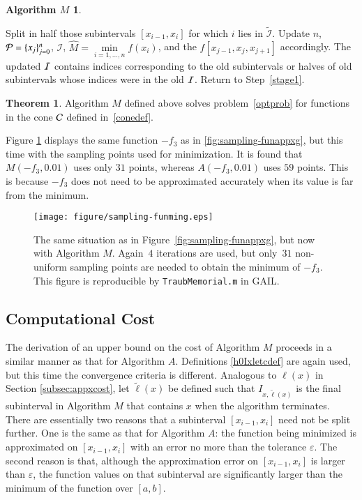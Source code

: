 \documentclass[review]{elsarticle}
\newcommand{\abstol}{\varepsilon}
\theoremstyle{definition}
\newtheorem*{algoM}{Algorithm $M$}
\newcommand{\tell}{\tilde{\ell}}
\newcommand{\hM}{\widehat{M}}
\newtheorem{theorem}{Theorem}
\newcommand{\minfi}{\min\limits_{i=1, \ldots,  n} f(x_i)} %
\begin{document}
\begin{algoM}
\begin{enumerate}[\em Step 1.]
		Split in half those subintervals $[x_{i-1},x_i]$ for which $i$ lies in $\widetilde{\mathcal{I}}$.
		Update $n$, $\mathcal{P} = \{x_j\}_{j=0}^n$, $\mathcal{I}$, $\hM = \minfi$, and the $f[x_{j-1}, x_{j}, x_{j+1}]$ accordingly.  The updated $\mathcal{I}$ contains  indices corresponding to the old subintervals or halves of old subintervals whose indices were in the old $\mathcal{I}$.  Return to Step~\ref{stage1}.
	\end{enumerate}
\end{algoM}

\begin{theorem} \label{thm:algMworks}
Algorithm $M$ defined above solves problem~\eqref{optprob} for functions in the cone $\mathcal{C}$ defined in~\eqref{conedef}.
\end{theorem}

Figure \ref{fig:sampling-funming}  displays the same function $-f_3$ as in \ref{fig:sampling-funappxg}, but this time with the sampling points used for minimization.  It is found that $M(-f_3,0.01)$ uses only $31$ points, whereas  $A(-f_3,0.01)$ uses $59$ points.  This is because $-f_3$ does not need to be approximated accurately when its value is far from the minimum.


\begin{figure}[tbh]
\centering
\texttt{[image: figure/sampling-funming.eps]}
\caption{The same situation as in Figure~\ref{fig:sampling-funappxg}, but now with Algorithm $M$.  Again~$4$ iterations are used, but only~$31$ non-uniform sampling points are needed to obtain the minimum of $-f_3$. This figure is reproducible by {\tt TraubMemorial.m} in GAIL.}
\label{fig:sampling-funming}
\end{figure}

\subsection{Computational Cost} \label{subsec:optcost}
The derivation of an upper bound on the cost of Algorithm $M$ proceeds in a similar manner as that for Algorithm $A$.  Definitions \eqref{h0Ixletcdef} are again used, but this time the convergence criteria is different.  Analogous to $\ell(x)$ in Section \ref{subsec:appxcost}, let $\tell(x)$ be defined such that $I_{x,\tell(x)}$ is the final subinterval in Algorithm $M$ that contains $x$ when the algorithm terminates. There are essentially two reasons that a subinterval $[x_{i-1},x_i]$ need not be split further.  One is the same as that for Algorithm $A$:  the function being minimized is approximated on $[x_{i-1},x_i]$ with an error no more than the tolerance $\abstol$.  The second reason is that, although the approximation error on $[x_{i-1},x_i]$ is larger than $\abstol$, the function values on that subinterval are significantly larger than the minimum of the function over $[a,b]$.
\end{document}
